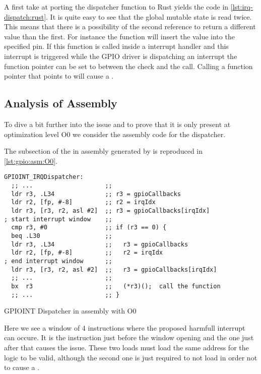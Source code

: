 A first take at porting the dispatcher function to Rust yields the code in \autoref{lst:irq-dispatch:rust}.
It is quite easy to see that the global mutable state is read twice.
This means that there is a possibility of the second reference to return a different value than the first.
For instance the function  will insert the value  into the specified pin.
If this function is called inside a interrupt handler and this interrupt is triggered while the GPIO driver is dispatching an interrupt the function pointer can be set to  between the check and the call.
Calling a function pointer that points to  will cause a .

\subsection{Analysis of Assembly}
To dive a bit further into the issue and to prove that it is only present at optimization level O0 we consider the assembly code for the dispatcher.

The subsection of the  in assembly generated by  is reproduced in \autoref{lst:gpio:asm:O0}.

\begin{listing}[H]
  \begin{verbatim}
GPIOINT_IRQDispatcher:
  ;; ...                    ;;
  ldr r3, .L34              ;; r3 = gpioCallbacks
  ldr r2, [fp, #-8]         ;; r2 = irqIdx
  ldr r3, [r3, r2, asl #2]  ;; r3 = gpioCallbacks[irqIdx]
; start interrupt window    ;;
  cmp r3, #0                ;; if (r3 == 0) {
  beq .L30                  ;;
  ldr r3, .L34              ;;   r3 = gpioCallbacks
  ldr r2, [fp, #-8]         ;;   r2 = irqIdx
; end interrupt window      ;;
  ldr r3, [r3, r2, asl #2]  ;;   r3 = gpioCallbacks[irqIdx]
  ;; ...                    ;;
  bx  r3                    ;;   (*r3)();  call the function
  ;; ...                    ;; }
  \end{verbatim}
  \caption{GPIOINT Dispatcher in assembly with O0}
  \label{lst:gpio:asm:O0}
\end{listing}

Here we see a window of 4 instructions where the proposed harmfull interrupt can occure.
It is the  instruction just before the window opening and the one just after that causes the issue.
These two loads must load the same address for the logic to be valid, although the second one is just required to not load  in order not to cause a .

